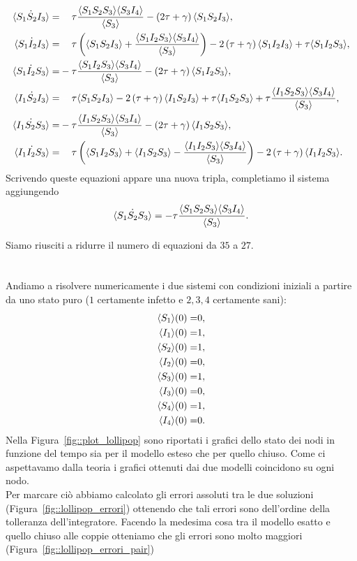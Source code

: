  \begin{equation*}
 \begin{aligned}
\dot{\angol{S_1S_2I_3}}=&\spa \tau \frac{\angol{S_1S_2S_3}\angol{S_3I_4}}{\angol{S_3}} -\tonde{ 2\tau + \gamma} \angol{S_1S_2I_3},\\
\dot{\angol{S_1I_2I_3}} =&\spa \tau \tonde{ \angol{S_1S_2I_3}+\frac{\angol{S_1I_2S_3}\angol{S_3I_4}}{\angol{S_3} }} -2\tonde{ \tau + \gamma} \angol{S_1I_2I_3} + \tau \angol{S_1 I_2 S_3},\\
\dot{\angol{S_1I_2S_3}} =&-\tau \frac{\angol{S_1I_2S_3}\angol{S_3I_4}}{\angol{S_3}} -\tonde{ 2\tau + \gamma} \angol{S_1I_2S_3},\\
\dot{\angol{I_1S_2I_3}} =&\spa \tau  \angol{S_1S_2I_3} -2\tonde{ \tau + \gamma} \angol{I_1S_2I_3} + \tau \angol{I_1S_2S_3}+\tau \frac{\angol{I_1S_2S_3}\angol{S_3I_4}}{\angol{S_3}},\\
\dot{\angol{I_1S_2S_3}}=&-\tau \frac{\angol{ I_1S_2S_3}\angol{S_3I_4}}{\angol{S_3}}-\tonde{ 2 \tau + \gamma} \angol{I_1S_2S_3},\\
\dot{\angol{I_1I_2S_3}} =&\spa\tau \tonde{  \angol{S_1I_2S_3}+ \angol{I_1S_2S_3} - \frac{\angol{I_1I_2S_3}\angol{S_3I_4}}{\angol{S_3}}} -2\tonde{ \tau + \gamma} \angol{I_1I_2S_3}.
 	\end{aligned}
 	\end{equation*}
 Scrivendo queste equazioni appare una nuova tripla, completiamo il sistema aggiungendo 
$$\dot{\langle S_1 S_2 S_3 \rangle} = -\tau\frac{\langle S_1S_2S_3 \rangle\langle S_3I_4 \rangle}{\langle S_3 \rangle}.$$
 
Siamo riusciti a ridurre il numero di equazioni da $35$ a $27$.\\ \\ \\
 Andiamo a risolvere numericamente i due sistemi con condizioni iniziali a partire da uno stato puro ($1$ certamente infetto e $2,3,4$ certamente sani):
\begin{equation}
\label{statipuri_lollipop}
\begin{aligned}
\langle S_1 \rangle(0) =& 0, \\
\langle I_1 \rangle(0) =& 1,\\
\langle S_2 \rangle(0) = &1, \\
\langle I_2 \rangle(0) = &0,\\
\langle S_3 \rangle(0) = &1, \\
\langle I_3 \rangle(0) = &0,\\
\langle S_4 \rangle(0) =& 1, \\
\langle I_4 \rangle(0) = &0.
\end{aligned}
\end{equation}
Nella Figura~\ref{fig::plot_lollipop} sono riportati i grafici dello stato dei nodi in funzione del tempo sia per il modello esteso che per quello chiuso. Come ci aspettavamo dalla teoria i grafici ottenuti dai due modelli coincidono su ogni nodo.\\
Per marcare ci\`o abbiamo calcolato gli errori assoluti tra le due soluzioni (Figura~\ref{fig::lollipop_errori}) ottenendo che tali errori sono dell'ordine della tolleranza dell'integratore. Facendo la medesima cosa tra il modello esatto e quello chiuso alle coppie otteniamo che gli errori sono molto maggiori (Figura~\ref{fig::lollipop_errori_pair})

